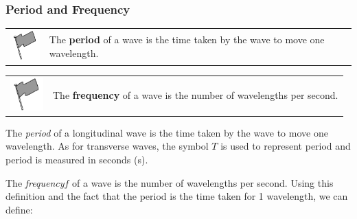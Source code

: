             \subsubsection{ Period and Frequency}
            \nopagebreak
            \par
            \label{m38782*fhsst!!!underscore!!!id143}\begin{definition}
	  \begin{tabular*}{15 cm}{m{15 mm}m{}}
	\hspace*{-50pt}  \includegraphics[width=0.5in]{col11305.imgs/psflag2.png}   & \Definition{   \label{id2445953}\textbf{ Period }} { \label{m38782*meaningfhsst!!!underscore!!!id143}
       The \textbf{period} of a wave is the time taken by the wave to move one wavelength.
         } 
      \end{tabular*}
      \end{definition}
\par
            \label{m38782*fhsst!!!underscore!!!id146}\begin{definition}
	  \begin{tabular*}{15 cm}{m{15 mm}m{}}
	\hspace*{-50pt}  \includegraphics[width=0.5in]{col11305.imgs/psflag2.png}   & \Definition{   \label{id2445977}\textbf{ Frequency }} { \label{m38782*meaningfhsst!!!underscore!!!id146}
        The \textbf{frequency} of a wave is the number of wavelengths per second.  
         } 
      \end{tabular*}
      \end{definition}
        \label{m38782*id292523}The \textsl{period} of a longitudinal wave is the time taken by the wave to move one wavelength. As for transverse waves, the symbol $T$ is used to represent period and period is measured in seconds (s).\par 
        \label{m38782*id292542}The \textsl{frequency}$f$ of a wave is the number of wavelengths per second. Using this definition and the fact that the period is the time taken for 1 wavelength, we can define:\par 
        \label{m38782*id291687}\nopagebreak\noindent{}
          
